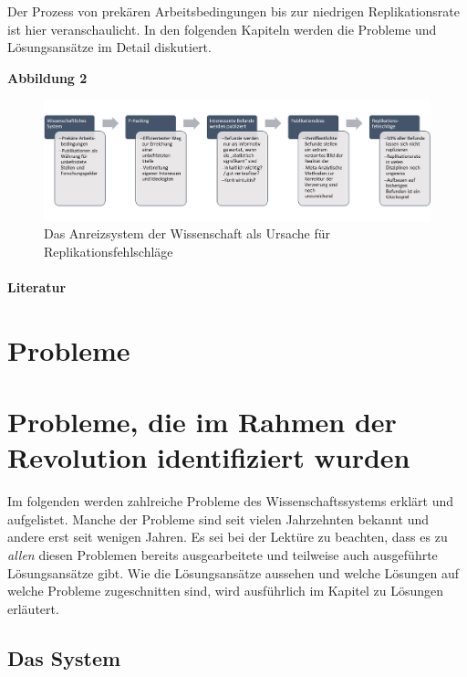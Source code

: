 \documentclass[
  letterpaper,
  DIV=11,
  numbers=noendperiod]{scrreprt}
\begin{document}
Der Prozess von prekären Arbeitsbedingungen bis zur niedrigen
Replikationsrate ist hier veranschaulicht. In den folgenden Kapiteln
werden die Probleme und Lösungsansätze im Detail diskutiert.

\textbf{Abbildung 2}

\begin{figure}[H]

{\centering \includegraphics{images/struktur.jpg}

}

\caption{Das Anreizsystem der Wissenschaft als Ursache für
Replikationsfehlschläge}

\end{figure}%

\subsection{Literatur}\label{literatur-7}

\part{Probleme}

\part{Probleme, die im Rahmen der Revolution identifiziert wurden}

Im folgenden werden zahlreiche Probleme des Wissenschaftssystems erklärt
und aufgelistet. Manche der Probleme sind seit vielen Jahrzehnten
bekannt und andere erst seit wenigen Jahren. Es sei bei der Lektüre zu
beachten, dass es zu \emph{allen} diesen Problemen bereits
ausgearbeitete und teilweise auch ausgeführte Lösungsansätze gibt. Wie
die Lösungsansätze aussehen und welche Lösungen auf welche Probleme
zugeschnitten sind, wird ausführlich im Kapitel zu Lösungen erläutert.

\chapter{Das System}\label{das-system}
\end{document}
